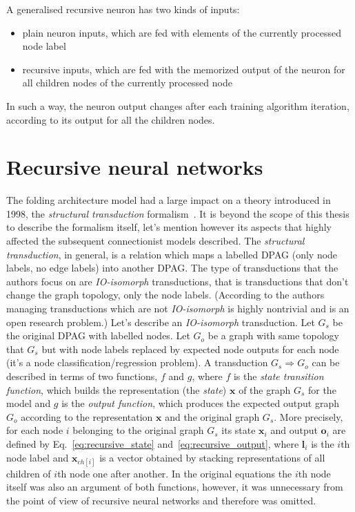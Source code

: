 \noindent A generalised recursive neuron has two kinds of inputs:
\begin{itemize}
\item plain neuron inputs, which are fed with elements of the currently processed node label
\item recursive inputs, which are fed with the memorized output of the neuron for all children nodes of the currently processed node
\end{itemize}

\noindent In such a way, the neuron output changes after each training algorithm iteration, according to its output for all the children nodes.

\section{Recursive neural networks}
The folding architecture model had a large impact on a theory introduced in 1998, the \emph{structural transduction} formalism~\cite{frasconi1998general}. It is beyond the scope of this thesis to describe the formalism itself, let's mention however its aspects that highly affected the subsequent connectionist models described. The \emph{structural transduction}, in general, is a relation which maps a labelled DPAG (only node labels, no edge labels) into another DPAG. The type of transductions that the authors focus on are \emph{IO-isomorph} transductions, that is transductions that don't change the graph topology, only the node labels. (According to the authors managing transductions which are not \emph{IO-isomorph} is highly nontrivial and is an open research problem.) Let's describe an \emph{IO-isomorph} transduction. Let $G_s$ be the original DPAG with labelled nodes. Let $G_o$ be a graph with same topology that $G_s$ but with node labels replaced by expected node outputs for each node (it's a node classification/regression problem). A transduction $G_s \Rightarrow G_o$ can be described in terms of two functions, $f$ and $g$, where $f$ is the \emph{state transition function}, which builds the representation (the \emph{state}) $\bm{x}$ of the graph $G_s$ for the model and $g$ is the \emph{output function}, which produces the expected output graph $G_o$ according to the representation $\bm{x}$ and the original graph $G_s$. More precisely, for each node $i$ belonging to the original graph $G_s$ its state $\bm{x}_i$ and output ${\bm{o}}_i$ are defined by Eq.~\ref{eq:recursive_state} and~\ref{eq:recursive_output}, where $\bm{l}_i$ is the $i$th node label and $\bm{x}_{ch[i]}$ is a vector obtained by stacking representations of all children of $i$th node one after another. In the original equations the $i$th node itself was also an argument of both functions, however, it was unnecessary from the point of view of recursive neural networks and therefore was omitted. 

